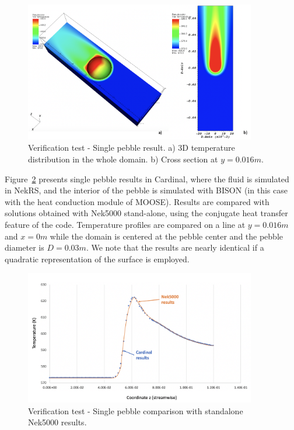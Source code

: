 \begin{figure}[!h]
\centering
\includegraphics[clip=true,width=0.9\textwidth]{Figures/nrs_vv1}
\caption{Verification test - Single pebble result. a) 3D temperature distribution in the whole domain. b) Cross section at $y=0.016 m$.}
\label{f:nrs1}
\end{figure}

Figure~\ref{f:nrs2} presents single pebble results in Cardinal,  where the fluid is simulated in NekRS, and the interior of the pebble is simulated with BISON (in this case with the heat conduction module of MOOSE). Results are compared with solutions obtained with Nek5000 stand-alone, using the conjugate heat transfer feature of the code. Temperature profiles are compared on a line at $y=0.016 m$ and $x=0 m$ while the domain is centered at the pebble center and the pebble diameter is $D=0.03 m$. We note that the results are nearly identical if a quadratic representation of the surface is employed.

\begin{figure}[!h]
\centering
\includegraphics[clip=true,width=0.9\textwidth]{Figures/nrs_vv2}
\caption{Verification test - Single pebble comparison with standalone Nek5000 results. }
\label{f:nrs2}
\end{figure}

